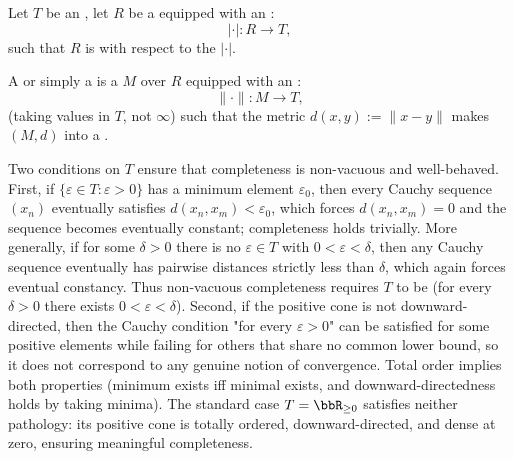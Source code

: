 \begin{definition} \label{definition:banach_space_over_a_commutative_ring_with_an_absolute_value_valued_in_an_ordered_semiring}
    Let $T$ be an , let $R$ be a  equipped with an :
    $$|\cdot| : R \to T,$$
    such that $R$ is  with respect to the  $|\cdot|$.

    A  or simply a  is a  $M$ over $R$ equipped with an :
    $$\|\cdot\| : M \to T,$$
    (taking values in $T$, not $\infty$) such that the metric $d(x,y) := \|x - y\|$  makes $(M,d)$ into a .

    Two conditions on $T$ ensure that completeness is non-vacuous and well-behaved. First, if $\{\varepsilon \in T : \varepsilon > 0\}$ has a minimum element $\varepsilon_0$, then every Cauchy sequence $(x_n)$ eventually satisfies $d(x_n,x_m) < \varepsilon_0$, which forces $d(x_n,x_m) = 0$ and the sequence becomes eventually constant; completeness holds trivially. More generally, if for some $\delta > 0$ there is no $\varepsilon \in T$ with $0 < \varepsilon < \delta$, then any Cauchy sequence eventually has pairwise distances strictly less than $\delta$, which again forces eventual constancy. Thus non-vacuous completeness requires $T$ to be  (for every $\delta > 0$ there exists $0 < \varepsilon < \delta$). Second, if the positive cone is not downward-directed, then the Cauchy condition "for every $\varepsilon > 0$" can be satisfied for some positive elements while failing for others that share no common lower bound, so it does not correspond to any genuine notion of convergence. Total order implies both properties (minimum exists iff minimal exists, and downward-directedness holds by taking minima). The standard case $T = \bbR_{\geq 0}$ satisfies neither pathology: its positive cone is totally ordered, downward-directed, and dense at zero, ensuring meaningful completeness.


\end{definition}
